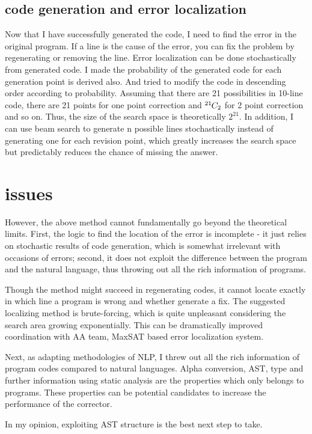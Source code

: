 \documentclass[nocopyrightspace]{sigplanconf}
\newcommand*{\permcomb}[4][0mu]{{{}^{#3}\mkern#1#2_{#4}}}
\newcommand*{\comb}[1][-1mu]{\permcomb[#1]{C}}
\begin{document}

\subsection{code generation and error localization}

Now that I have successfully generated the code, I need to find the error in the original program. If a line is the cause of the error, you can fix the problem by regenerating or removing the line. Error localization can be done stochastically from generated code. I made the probability of the generated code for each generation point is derived also. And tried to modify the code in descending order according to probability. Assuming that there are 21 possibilities in 10-line code, there are 21 points for one point correction and $ \comb{21}{2} $ for 2 point correction and so on. Thus, the size of the search space is theoretically $ 2^{21} $. In addition, I can use beam search to generate n possible lines stochastically instead of generating one for each revision point, which greatly increases the search space but predictably reduces the chance of missing the answer.

\section{issues}

However, the above method cannot fundamentally go beyond the theoretical limits. First, the logic to find the location of the error is incomplete - it just relies on stochastic results of code generation, which is somewhat irrelevant with occasions of errors; second, it does not exploit the difference between the program and the natural language, thus throwing out all the rich information of programs.

Though the method might succeed in regenerating codes, it cannot locate exactly in which line a program is wrong and whether generate a fix. The suggested localizing method is brute-forcing, which is quite unpleasant considering the search area growing exponentially. This can be dramatically improved coordination with AA team, MaxSAT based error localization system.

Next, as adapting methodologies of NLP, I threw out all the rich information of program codes compared to natural languages. Alpha conversion, AST\cite{mou2016convolutional}, type and further information using static analysis are the properties which only belongs to programs. These properties can be potential candidates to increase the performance of the corrector.

In my opinion, exploiting AST structure is the best next step to take.








\end{document}
